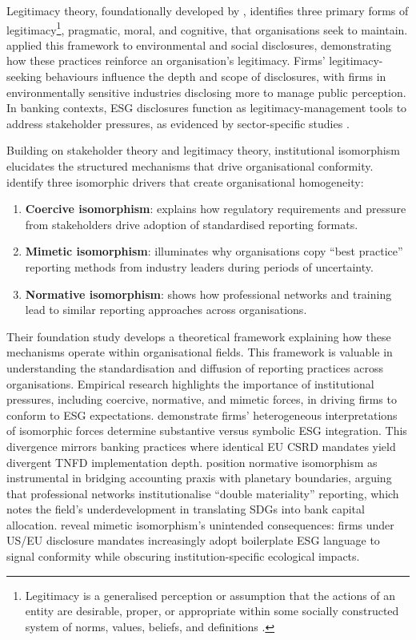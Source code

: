 \documentclass[
  authoryear]{elsarticle}
\begin{document}
Legitimacy theory, foundationally developed by \citet{SUCHMAN1995},
identifies three primary forms of legitimacy\footnote{Legitimacy is a
  generalised perception or assumption that the actions of an entity are
  desirable, proper, or appropriate within some socially constructed
  system of norms, values, beliefs, and definitions
  \citep{GINZEL2000, NEILSEN1987, PERROW1970}.}, pragmatic, moral, and
cognitive, that organisations seek to maintain. \citet{DEEGAN2002}
applied this framework to environmental and social disclosures,
demonstrating how these practices reinforce an organisation's
legitimacy. Firms' legitimacy-seeking behaviours influence the depth and
scope of disclosures, with firms in environmentally sensitive industries
disclosing more to manage public perception. In banking contexts, ESG
disclosures function as legitimacy-management tools to address
stakeholder pressures, as evidenced by sector-specific studies
\citep[see][]{THOMPSON2004, MURE2021, CARNEVALE2014}.

Building on stakeholder theory and legitimacy theory, institutional
isomorphism elucidates the structured mechanisms that drive
organisational conformity. \citet{DIMAGGIO1983} identify three
isomorphic drivers that create organisational homogeneity:

\begin{enumerate}
\def\labelenumi{\arabic{enumi}.}
\item
  \textbf{Coercive isomorphism}: explains how regulatory requirements
  and pressure from stakeholders drive adoption of standardised
  reporting formats.
\item
  \textbf{Mimetic isomorphism}: illuminates why organisations copy
  ``best practice'' reporting methods from industry leaders during
  periods of uncertainty.
\item
  \textbf{Normative isomorphism}: shows how professional networks and
  training lead to similar reporting approaches across organisations.
\end{enumerate}

Their foundation study develops a theoretical framework explaining how
these mechanisms operate within organisational fields. This framework is
valuable in understanding the standardisation and diffusion of reporting
practices across organisations. Empirical research highlights the
importance of institutional pressures, including coercive, normative,
and mimetic forces, in driving firms to conform to ESG expectations.
\citet{DELMAS2004} demonstrate firms' heterogeneous interpretations of
isomorphic forces determine substantive versus symbolic ESG integration.
This divergence mirrors banking practices where identical EU CSRD
mandates yield divergent TNFD implementation depth.
\citet{BEBBINGTON2018} position normative isomorphism as instrumental in
bridging accounting praxis with planetary boundaries, arguing that
professional networks institutionalise ``double materiality'' reporting,
which notes the field's underdevelopment in translating SDGs into bank
capital allocation. \citet{CHRISTENSEN2021} reveal mimetic isomorphism's
unintended consequences: firms under US/EU disclosure mandates
increasingly adopt boilerplate ESG language to signal conformity while
obscuring institution-specific ecological impacts.
\end{document}
